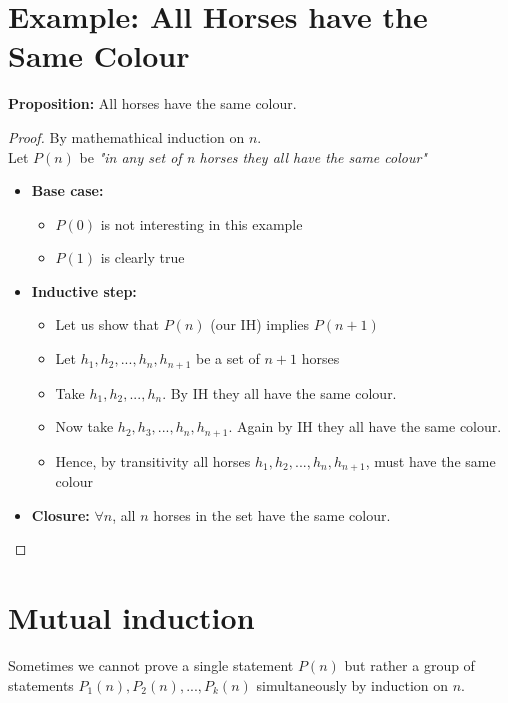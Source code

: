 \section{Example: All Horses have the Same Colour} %
\label{sec:example_all_horses_have_the_same_colour}
\textbf{Proposition:} All horses have the same colour.
\begin{proof}
    By mathemathical induction on $n$.\\
    Let $P(n)$ be \emph{"in any set of n horses they all have the same colour"}
    \begin{itemize}
        \item \textbf{Base case:}
        \begin{itemize}
            \item $P(0)$ is not interesting in this example
            \item $P(1)$ is clearly true
        \end{itemize}
        \item \textbf{Inductive step:}
        \begin{itemize}
            \item Let us show that $P(n)$ (our IH) implies $P(n + 1)$
            \item Let $h_1, h_2,..., h_n, h_{n+1}$ be a set of $n + 1$ horses
            \item Take $h_1, h_2,..., h_n$. By IH they all have the same colour.
            \item Now take $h_2, h_3,..., h_n,h_{n+1}$. Again by IH they all have the same colour.
            \item Hence, by transitivity all horses $h_1, h_2,..., h_n, h_{n+1}$, must have the same colour
        \end{itemize}
        \item \textbf{Closure:} $\forall n$, all $n$ horses in the set have the same colour.
    \end{itemize}
\end{proof}

\section{Mutual induction} %
\label{sec:mutual_induction}
Sometimes we cannot prove a single statement $P(n)$ but rather a group of statements $P_1(n), P_2(n),..., P_k(n)$ simultaneously by induction on $n$.\\
\smallskip

